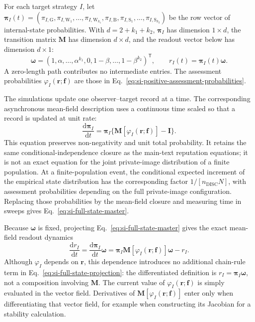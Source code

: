 \documentclass[fleqn,10pt]{wlscirep}
\begin{document}
For each target strategy $I$, let $\boldsymbol\pi_I(t)=(\pi_{I,\mathrm G},\pi_{I,\mathrm W_1},\ldots,\pi_{I,\mathrm W_{k_1}},\pi_{I,\mathrm B},\pi_{I,\mathrm S_1},\ldots,\pi_{I,\mathrm S_{k_2}})$ be the row vector of internal-state probabilities. With $d=2+k_1+k_2$, $\boldsymbol\pi_I$ has dimension $1\times d$, the transition matrix $\mathbf M$ has dimension $d\times d$, and the readout vector below has dimension $d\times1$:
\begin{equation}
\boldsymbol\omega=(1,\alpha,\ldots,\alpha^{k_1},0,1-\beta,\ldots,1-\beta^{k_2})^{\mathsf T},
\qquad r_I(t)=\boldsymbol\pi_I(t)\boldsymbol\omega.
\label{eq:si-full-state-readout}
\end{equation}
A zero-length path contributes no intermediate entries. The assessment probabilities $\varphi_I(\boldsymbol r;\boldsymbol f)$ are those in Eq.~\eqref{eq:si-positive-assessment-probabilities}.

The simulations update one observer--target record at a time. The corresponding asynchronous mean-field description uses a continuous time scaled so that a record is updated at unit rate:
\begin{equation}
\frac{\mathrm d\boldsymbol\pi_I}{\mathrm dt}
=\boldsymbol\pi_I\{\mathbf M[\varphi_I(\boldsymbol r;\boldsymbol f)]-\mathbf I\}.
\label{eq:si-full-state-master}
\end{equation}
This equation preserves non-negativity and unit total probability. It retains the same conditional-independence closure as the main-text reputation equations; it is not an exact equation for the joint private-image distribution of a finite population. At a finite-population event, the conditional expected increment of the empirical state distribution has the corresponding factor $1/[n_{\mathrm{DISC}}N]$, with assessment probabilities depending on the full private-image configuration. Replacing those probabilities by the mean-field closure and measuring time in sweeps gives Eq.~\eqref{eq:si-full-state-master}.

Because $\boldsymbol\omega$ is fixed, projecting Eq.~\eqref{eq:si-full-state-master} gives the exact mean-field readout dynamics
\begin{equation}
\frac{\mathrm d r_I}{\mathrm dt}
=\frac{\mathrm d\boldsymbol\pi_I}{\mathrm dt}\boldsymbol\omega
=\boldsymbol\pi_I\mathbf M[\varphi_I(\boldsymbol r;\boldsymbol f)]\boldsymbol\omega-r_I.
\label{eq:si-full-state-projection}
\end{equation}
Although $\varphi_I$ depends on $\boldsymbol r$, this dependence introduces no additional chain-rule term in Eq.~\eqref{eq:si-full-state-projection}: the differentiated definition is $r_I=\boldsymbol\pi_I\boldsymbol\omega$, not a composition involving $\mathbf M$. The current value of $\varphi_I(\boldsymbol r;\boldsymbol f)$ is simply evaluated in the vector field. Derivatives of $\mathbf M[\varphi_I(\boldsymbol r;\boldsymbol f)]$ enter only when differentiating that vector field, for example when constructing its Jacobian for a stability calculation.
\end{document}
